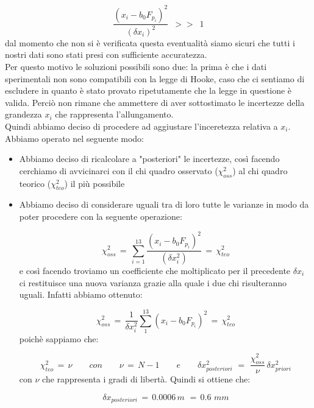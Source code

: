 \begin{equation*}
	\frac{(x_i - b_0 F_{p_i})^2}{(\delta x_i)^2} \,\,\, >> \,\,\, 1
\end{equation*}
%
dal momento che non si è verificata questa eventualità siamo sicuri che tutti i nostri dati sono stati presi con sufficiente accuratezza.\\
Per questo motivo le soluzioni possibili sono due: la prima è che i dati sperimentali non sono compatibili con la legge di Hooke, caso che ci sentiamo di escludere in quanto è stato provato ripetutamente che la legge in questione è valida. Perciò non rimane che ammettere di aver sottostimato le incertezze della grandezza $x_i$ che rappresenta l'allungamento.\\
Quindi abbiamo deciso di procedere ad aggiustare l'inceretezza relativa a $x_i$. Abbiamo operato nel seguente modo:
\begin{itemize}
\item{Abbiamo deciso di ricalcolare a "posteriori" le incertezze, così facendo cerchiamo di avvicinarci con il chi quadro osservato ($\chi_{oss}^2$) al chi quadro teorico ($\chi_{teo}^2$) il più possibile}
\item{Abbiamo deciso di considerare uguali tra di loro tutte le varianze in modo da poter procedere con la seguente operazione:

	\begin{equation*}
		\chi_{oss}^2 \,=\, \sum_{i=1}^{13} \frac{(x_i - b_0 F_{p_i})^2}{(\delta x_i^2)} \,=\, \chi_{teo}^2 
	\end{equation*}
	e così facendo troviamo un coefficiente che moltiplicato per il precedente $\delta x_i$ ci restituisce una nuova varianza grazie alla quale i due chi risulteranno uguali. Infatti abbiamo ottenuto:
	
	\begin{equation*}
		\chi_{oss}^2 \,=\, \frac{1}{\delta x_{i}^2} \sum_{1}^{13} (x_i - b_0 F_{p_i})^2  \,=\, \chi_{teo}^2
	\end{equation*}
	poichè sappiamo che:
	
	\begin{equation*}
		\chi_{teo}^2 \,=\, \nu \quad \quad con \quad \quad
		\nu \,=\, N - 1 \quad \quad e \quad \quad
		\delta x_{posteriori}^2 \,\,=\,\, \frac{\chi_{oss}^2}{\nu} \, \delta x_{priori}^2
	\end{equation*}
	con $\nu$ che rappresenta i gradi di libertà.
	Quindi si ottiene che:
	
	\begin{equation*}
		\delta x_{posteriori} \,=\, 0.0006 \,m \,\,=\, 0.6 \,\, mm
	\end{equation*}}	 
\end{itemize}
